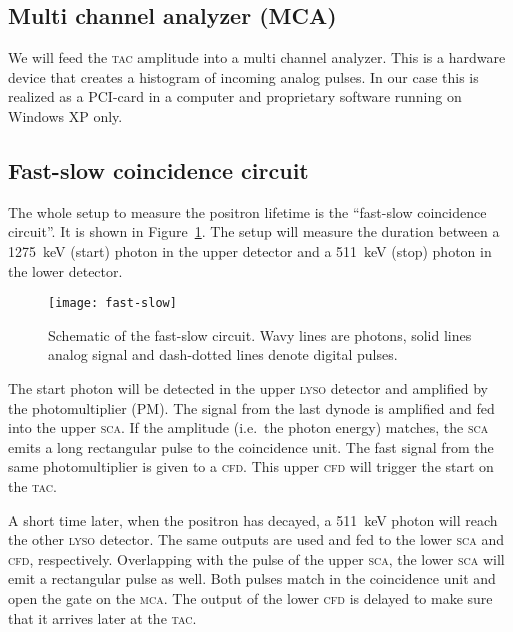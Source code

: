 \documentclass[11pt, english, fleqn, DIV=15, headinclude, BCOR=2cm]{scrreprt}
\begin{document}
\subsection{Multi channel analyzer (MCA)}

We will feed the \textsc{tac} amplitude into a multi channel analyzer. This is
a hardware device that creates a histogram of incoming analog pulses. In our
case this is realized as a PCI-card in a computer and proprietary software
running on Windows XP only.

\subsection{Fast-slow coincidence circuit}

The whole setup to measure the positron lifetime is the \enquote{fast-slow
coincidence circuit}. It is shown in Figure~\ref{fig:fast-slow}. The setup will
measure the duration between a \SI{1275}{\kilo\electronvolt} (start) photon in
the upper detector and a \SI{511}{\kilo\electronvolt} (stop) photon in the
lower detector.

\begin{figure}
    \centering
    \texttt{[image: fast-slow]}
    \caption{%
        Schematic of the fast-slow circuit. Wavy lines are photons, solid lines
        analog signal and dash-dotted lines denote digital pulses.
    }
    \label{fig:fast-slow}
\end{figure}

The start photon will be detected in the upper \textsc{lyso} detector and amplified by
the photomultiplier (PM). The signal from the last dynode is amplified and fed
into the upper \textsc{sca}\@. If the amplitude (i.e.\ the photon energy) matches, the \textsc{sca}
emits a long rectangular pulse to the coincidence unit. The fast signal from
the same photomultiplier is given to a \textsc{cfd}\@. This upper \textsc{cfd} will trigger the
start on the \textsc{tac}\@.

A short time later, when the positron has decayed, a
\SI{511}{\kilo\electronvolt} photon will reach the other \textsc{lyso} detector. The
same outputs are used and fed to the lower \textsc{sca} and \textsc{cfd}, respectively.
Overlapping with the pulse of the upper \textsc{sca}, the lower \textsc{sca} will emit a
rectangular pulse as well. Both pulses match in the coincidence unit and open
the gate on the \textsc{mca}\@. The output of the lower \textsc{cfd} is delayed to make sure that
it arrives later at the \textsc{tac}\@.
\end{document}
